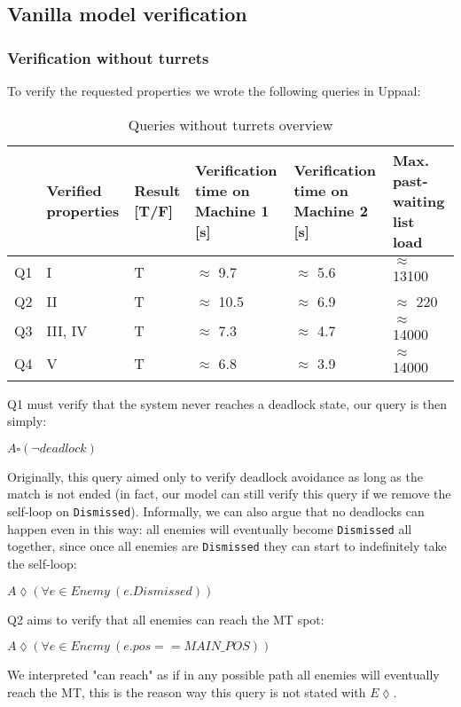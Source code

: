 \documentclass[
10pt, %
a4paper, %
oneside, %
headinclude,footinclude, %
BCOR5mm, %
]{scrartcl}
\begin{document}
		\subsection{Vanilla model verification}
			\subsubsection{Verification without turrets}
				To verify the requested properties we wrote the following queries in Uppaal:
				\begin{table}[H]
					\centering
					\begin{tabularx}{\textwidth}{||c|>{\raggedright\arraybackslash}X|>{\raggedright\arraybackslash}X|>{\raggedright\arraybackslash}X|>{\raggedright\arraybackslash}X|>{\raggedright\arraybackslash}X||}
						\hline
						 & Verified properties & Result [T/F] & Verification time on Machine 1 [s] & Verification time on Machine 2 [s] & Max. past-waiting list load \\
						\hline
						Q1 & I & T& $\approx$ 9.7 & $\approx$ 5.6& $\approx$ 13100\\ \hline
						Q2 & II & T&  $\approx$ 10.5 & $\approx$ 6.9 & $\approx$ 220\\ \hline
						Q3 & III, IV & T&  $\approx$ 7.3& $\approx$ 4.7 & $\approx$ 14000\\ \hline
						Q4 & V & T&  $\approx$ 6.8& $\approx$ 3.9 & $\approx$ 14000\\
						\hline
					\end{tabularx}
					\caption{Queries without turrets overview}
				\end{table}
				Q1 must verify that the system never reaches a deadlock state, our query is then simply:
				\begin{center}
					$A\square(\lnot deadlock)$
				\end{center}
				Originally, this query aimed only to verify deadlock avoidance as long as the match is not ended (in fact, our model can still verify this query if we remove the self-loop on \texttt{Dismissed}). Informally, we can also argue that no deadlocks can happen even in this way: all enemies will eventually become \texttt{Dismissed} all together, since once all enemies are \texttt{Dismissed} they can start to indefinitely take the self-loop:
				\begin{center}
					$A\lozenge(\forall e \in Enemy\ (e.Dismissed))$
				\end{center}
				
				Q2 aims to verify that all enemies can reach the MT spot:
				\begin{center}
					$A\lozenge(\forall e \in Enemy\ (e.pos==MAIN\_POS))$
				\end{center}
				We interpreted "can reach" as if in any possible path all enemies will eventually reach the MT, this is the reason way this query is not stated with $E\lozenge$.
				
\end{document}
